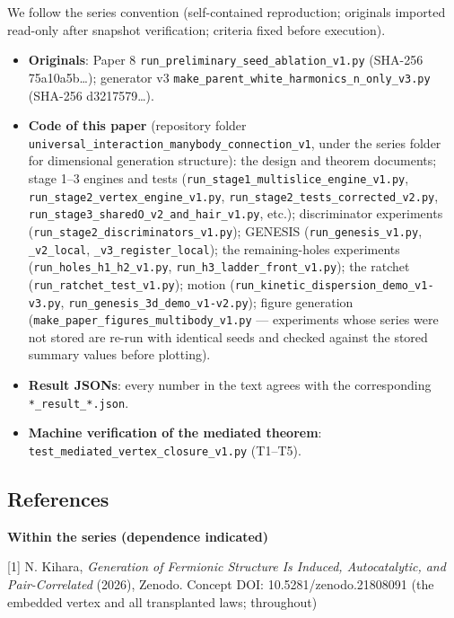 \documentclass[
  a4paper,
]{article}
\providecommand{\tightlist}{%
  \setlength{\itemsep}{0pt}\setlength{\parskip}{0pt}}
\begin{document}
We follow the series convention (self-contained reproduction; originals
imported read-only after snapshot verification; criteria fixed before
execution).

\begin{itemize}
\tightlist
\item
  \textbf{Originals}: Paper 8
  \texttt{run\_preliminary\_seed\_ablation\_v1.py} (SHA-256
  75a10a5b\ldots); generator v3
  \texttt{make\_parent\_white\_harmonics\_n\_only\_v3.py} (SHA-256
  d3217579\ldots).
\item
  \textbf{Code of this paper} (repository folder
  \texttt{universal\_interaction\_manybody\_connection\_v1}, under the
  series folder for dimensional generation structure): the design and
  theorem documents; stage 1--3 engines and tests
  (\texttt{run\_stage1\_multislice\_engine\_v1.py},
  \texttt{run\_stage2\_vertex\_engine\_v1.py},
  \texttt{run\_stage2\_tests\_corrected\_v2.py},
  \texttt{run\_stage3\_sharedO\_v2\_and\_hair\_v1.py}, etc.);
  discriminator experiments
  (\texttt{run\_stage2\_discriminators\_v1.py}); GENESIS
  (\texttt{run\_genesis\_v1.py}, \texttt{\_v2\_local},
  \texttt{\_v3\_register\_local}); the remaining-holes experiments
  (\texttt{run\_holes\_h1\_h2\_v1.py},
  \texttt{run\_h3\_ladder\_front\_v1.py}); the ratchet
  (\texttt{run\_ratchet\_test\_v1.py}); motion
  (\texttt{run\_kinetic\_dispersion\_demo\_v1-v3.py},
  \texttt{run\_genesis\_3d\_demo\_v1-v2.py}); figure generation
  (\texttt{make\_paper\_figures\_multibody\_v1.py} --- experiments whose
  series were not stored are re-run with identical seeds and checked
  against the stored summary values before plotting).
\item
  \textbf{Result JSONs}: every number in the text agrees with the
  corresponding \texttt{*\_result\_*.json}.
\item
  \textbf{Machine verification of the mediated theorem}:
  \texttt{test\_mediated\_vertex\_closure\_v1.py} (T1--T5).
\end{itemize}

\subsection{References}\label{references}

\textbf{Within the series (dependence indicated)}

{[}1{]} N. Kihara, \emph{Generation of Fermionic Structure Is Induced,
Autocatalytic, and Pair-Correlated} (2026), Zenodo. Concept DOI:
10.5281/zenodo.21808091 (the embedded vertex and all transplanted laws;
throughout)
\end{document}
